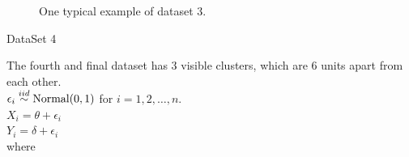 \documentclass[12]{report}
\begin{document}
 \begin{figure}[hbtp]
   \centering
       \caption{One typical example of dataset 3.}
       \label{data3}
\end{figure}




\Large{DataSet 4}\\[0.1cm]

\normalsize

The fourth and final dataset has 3 visible clusters, which are 6 units apart from each other.\\ 

$\epsilon_i \stackrel{iid}\sim \hbox{Normal} (0, 1)$ for $i = 1, 2, \dots, n.$ \\[0.2cm]
$X_i  = \theta + \epsilon_i$ \\
$Y_i = \delta + \epsilon_i$ \\
where 
\end{document}
